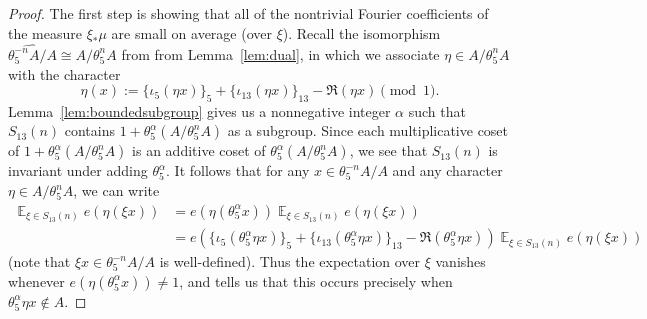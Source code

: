 \documentclass[11pt]{amsart}
\theoremstyle{definition}
\DeclareMathOperator*{\E}{\mathbb{E}}
\begin{document}
\begin{proof}
The first step is showing that all of the nontrivial Fourier coefficients of the measure $\xi_* \mu$ are small on average (over $\xi$).
Recall the isomorphism $\widehat{\theta_5^{-n}A/A} \cong A/\theta_5^n A$ from from Lemma~\ref{lem:dual}, in which we associate $\eta \in A/\theta_5^n A$ with the character
$$\eta(x):= \{\iota_{5}(\eta x)\}_5 + \{\iota_{13}(\eta x)\}_{13} - \Re(\eta x) \pmod{1}.$$
Lemma~\ref{lem:boundedsubgroup} gives us a nonnegative integer $\alpha$ such that $S_{13}(n)$ contains $1+\theta_5^\alpha(A/\theta_5^n A)$ as a subgroup.  Since each multiplicative coset of $1+\theta_5^\alpha(A/\theta_5^n A)$ is an additive coset of $\theta_5^\alpha(A/\theta_5^n A)$, we see that $S_{13}(n)$ is invariant under adding $\theta_5^\alpha$.  It follows that for any $x \in \theta_5^{-n}A/A$ and any character $\eta \in A/\theta_5^n A$, we can write
\begin{align*}
\E_{\xi \in S_{13}(n)} e(\eta(\xi x)) &=e(\eta(\theta_5^\alpha x))\E_{\xi \in S_{13}(n)} e(\eta(\xi x))\\
 &= e(\{\iota_{5}(\theta_5^\alpha\eta x)\}_5 + \{\iota_{13}(\theta_5^\alpha \eta x)\}_{13} - \Re(\theta_5^\alpha \eta x)) \E_{\xi \in S_{13}(n)} e(\eta(\xi x))
\end{align*}
(note that $\xi x \in \theta_5^{-n}A/A$ is well-defined).
Thus the expectation over $\xi$ vanishes whenever $e(\eta(\theta_5^\alpha x)) \neq 1$, and \cite[Proposition 6.2]{Man13} tells us that this occurs precisely when $\theta_5^\alpha \eta x \notin A$.


\end{proof}
\end{document}
